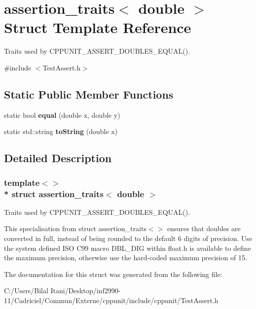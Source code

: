 \hypertarget{structassertion__traits_3_01double_01_4}{}\section{assertion\+\_\+traits$<$ double $>$ Struct Template Reference}
\label{structassertion__traits_3_01double_01_4}


Traits used by C\+P\+P\+U\+N\+I\+T\+\_\+\+A\+S\+S\+E\+R\+T\+\_\+\+D\+O\+U\+B\+L\+E\+S\+\_\+\+E\+Q\+U\+A\+L().  




{\ttfamily \#include $<$Test\+Assert.\+h$>$}

\subsection*{Static Public Member Functions}
\begin{DoxyCompactItemize}
\item 
static bool {\bfseries equal} (double x, double y)\hypertarget{structassertion__traits_3_01double_01_4_ac0d9d71ec0f239664b88188e481c0598}{}\label{structassertion__traits_3_01double_01_4_ac0d9d71ec0f239664b88188e481c0598}

\item 
static std\+::string {\bfseries to\+String} (double x)\hypertarget{structassertion__traits_3_01double_01_4_a6bc37874eb60d30e0b50d4c127ab34df}{}\label{structassertion__traits_3_01double_01_4_a6bc37874eb60d30e0b50d4c127ab34df}

\end{DoxyCompactItemize}


\subsection{Detailed Description}
\subsubsection*{template$<$$>$\\*
struct assertion\+\_\+traits$<$ double $>$}

Traits used by C\+P\+P\+U\+N\+I\+T\+\_\+\+A\+S\+S\+E\+R\+T\+\_\+\+D\+O\+U\+B\+L\+E\+S\+\_\+\+E\+Q\+U\+A\+L(). 

This specialisation from {\ttfamily struct} {\ttfamily assertion\+\_\+traits$<$$>$} ensures that doubles are converted in full, instead of being rounded to the default 6 digits of precision. Use the system defined I\+SO C99 macro D\+B\+L\+\_\+\+D\+IG within float.\+h is available to define the maximum precision, otherwise use the hard-\/coded maximum precision of 15. 

The documentation for this struct was generated from the following file\+:\begin{DoxyCompactItemize}
\item 
C\+:/\+Users/\+Bilal Itani/\+Desktop/inf2990-\/11/\+Cadriciel/\+Commun/\+Externe/cppunit/include/cppunit/Test\+Assert.\+h\end{DoxyCompactItemize}
